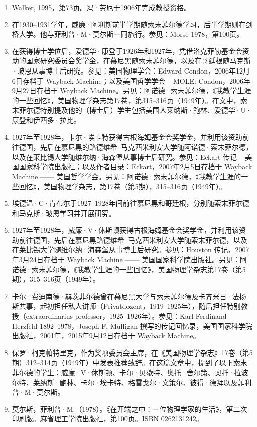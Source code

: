 \begin{enumerate}
\item Walker, 1995，第73页。冯·劳厄于1906年完成教授资格。
\item 在1930–1931学年，威廉·阿利斯前半学期随索末菲尔德学习，后半学期则在剑桥大学。他与菲利普·M·莫尔斯一同旅行。参见：Morse 1978，第100页。
\item 在获得博士学位后，爱德华·康登于1926年和1927年，凭借洛克菲勒基金会资助的国家研究委员会奖学金，在慕尼黑随索末菲尔德，以及在哥廷根随马克斯·玻恩从事博士后研究。参见：美国物理学会：Edward Condon，2006年12月6日存档于 Wayback Machine；以及美国哲学学会 – MOLE: Condon，2006年9月27日存档于 Wayback Machine。另见：阿诺德·索末菲尔德，《我教学生涯的一些回忆》，美国物理学杂志第17卷，第315–316页（1949年）。在文中，索末菲尔德特别提及他的（博士后）学生包括美国人莱纳斯·鲍林、爱德华·U·康登和伊西多·拉比。
\item 1927年至1928年，卡尔·埃卡特获得古根海姆基金会奖学金，并利用该资助前往德国，先后在慕尼黑的路德维希–马克西米利安大学随阿诺德·索末菲尔德，以及在莱比锡大学随维尔纳·海森堡从事博士后研究。参见：Eckart 传记 – 美国国家科学院出版社；以及作者目录：Eckart，2007年2月5日存档于 Wayback Machine —— 美国哲学学会。另见：阿诺德·索末菲尔德，《我教学生涯的一些回忆》，美国物理学杂志，第17卷（第5期），315–316页（1949年）。
\item 埃德温·C·肯布尔于1927–1928年间前往慕尼黑和哥廷根，分别随索末菲尔德和马克斯·玻恩学习并开展研究。
\item 1927年至1928年，威廉·V·休斯顿获得古根海姆基金会奖学金，并利用该资助前往德国，先后在慕尼黑路德维希–马克西米利安大学随索末菲尔德，以及在莱比锡大学随维尔纳·海森堡从事博士后研究。参见：Houston 传记，2007年3月24日存档于 Wayback Machine —— 美国国家科学院出版社。另见：阿诺德·索末菲尔德，《我教学生涯的一些回忆》，美国物理学杂志第17卷（第5期），315–316页（1949年）。
\item 卡尔·费迪南德·赫茨菲尔德曾在慕尼黑大学与索末菲尔德及卡齐米日·法扬斯共事，起初担任私人讲师（Privatdozent，1919–1925年），随后担任特别教授（extraordinarius professor，1925–1926年）。参见：Karl Ferdinand Herzfeld 1892–1978，Joseph F. Mulligan 撰写的传记回忆录，美国国家科学院出版社，2001年，2015年9月12日存档于 Wayback Machine。
\item 保罗·柯克帕特里克，作为奖项委员会主席，在《美国物理学杂志》17卷（第5期）312–314页（1949年）中发表推荐致辞。在这篇文章中，提到了以下索末菲尔德的学生：威廉·V·休斯顿、卡尔·贝歇特、奥托·舍尔策、奥托·拉波尔特、莱纳斯·鲍林、卡尔·埃卡特、格雷戈尔·文策尔、彼得·德拜以及菲利普·M·莫尔斯。
\item 莫尔斯，菲利普·M.（1978）。《在开端之中：一位物理学家的生活》，第二次印刷版。麻省理工学院出版社，第100页。ISBN 0262131242。

\end{enumerate}
